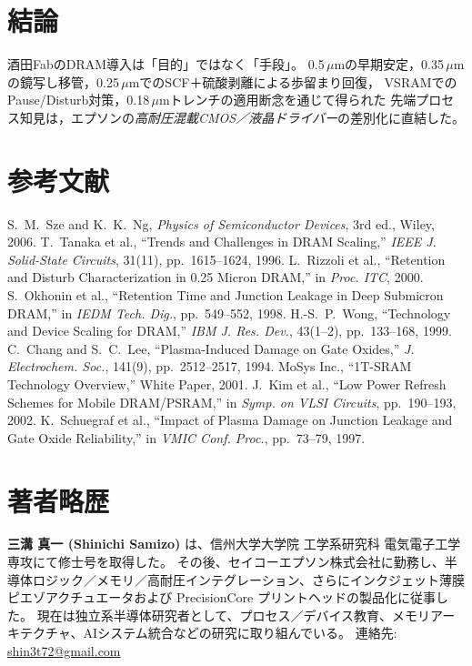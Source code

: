 \documentclass[conference]{IEEEtran}
\begin{document}
\section{結論}
酒田FabのDRAM導入は「目的」ではなく「手段」。
0.5\,$\mu$mの早期安定，0.35\,$\mu$mの鏡写し移管，0.25\,$\mu$mでのSCF＋硫酸剥離による歩留まり回復，
VSRAMでのPause/Disturb対策，0.18\,$\mu$mトレンチの適用断念を通じて得られた
先端プロセス知見は，エプソンの\emph{高耐圧混載CMOS／液晶ドライバー}の差別化に直結した。

\section*{参考文献}
\begin{thebibliography}{00}
S.~M.~Sze and K.~K.~Ng, \emph{Physics of Semiconductor Devices}, 3rd ed., Wiley, 2006.
T.~Tanaka et al., ``Trends and Challenges in DRAM Scaling,'' \emph{IEEE J. Solid-State Circuits}, 31(11), pp.~1615--1624, 1996.
L.~Rizzoli et al., ``Retention and Disturb Characterization in 0.25 Micron DRAM,'' in \emph{Proc. ITC}, 2000.
S.~Okhonin et al., ``Retention Time and Junction Leakage in Deep Submicron DRAM,'' in \emph{IEDM Tech. Dig.}, pp.~549--552, 1998.
H.-S.~P.~Wong, ``Technology and Device Scaling for DRAM,'' \emph{IBM J. Res. Dev.}, 43(1–2), pp.~133--168, 1999.
C.~Chang and S.~C.~Lee, ``Plasma-Induced Damage on Gate Oxides,'' \emph{J. Electrochem. Soc.}, 141(9), pp.~2512--2517, 1994.
MoSys Inc., ``1T-SRAM Technology Overview,'' White Paper, 2001.
J.~Kim et al., ``Low Power Refresh Schemes for Mobile DRAM/PSRAM,'' in \emph{Symp. on VLSI Circuits}, pp.~190--193, 2002.
K.~Schuegraf et al., ``Impact of Plasma Damage on Junction Leakage and Gate Oxide Reliability,'' in \emph{VMIC Conf. Proc.}, pp.~73--79, 1997.
\end{thebibliography}

\section*{著者略歴}
\noindent\textbf{三溝 真一 (Shinichi Samizo)} は、信州大学大学院 工学系研究科 電気電子工学専攻にて修士号を取得した。
その後、セイコーエプソン株式会社に勤務し、半導体ロジック／メモリ／高耐圧インテグレーション、さらにインクジェット薄膜ピエゾアクチュエータおよび PrecisionCore プリントヘッドの製品化に従事した。
現在は独立系半導体研究者として、プロセス／デバイス教育、メモリアーキテクチャ、AIシステム統合などの研究に取り組んでいる。
連絡先: \href{mailto:shin3t72@gmail.com}{shin3t72@gmail.com}
\end{document}
